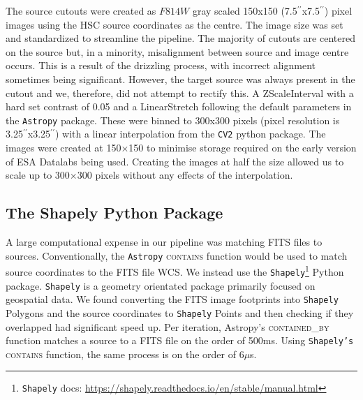 The source cutouts were created as $F814W$ gray scaled 150x150 (7.5$^{\prime \prime}$x7.5$^{\prime \prime}$) pixel images using the HSC source coordinates as the centre. The image size was set and standardized to streamline the pipeline. The majority of cutouts are centered on the source but, in a minority, misalignment between source and image centre occurs. This is a result of the drizzling process, with incorrect alignment sometimes being significant. However, the target source was always present in the cutout and we, therefore, did not attempt to rectify this. A ZScaleInterval with a hard set contrast of 0.05 and a LinearStretch following the default parameters in the \texttt{Astropy} \citep{astropy:2013, astropy:2018} package. These were binned to 300x300 pixels (pixel resolution is 3.25$^{\prime \prime}$x3.25$^{\prime \prime}$) with a linear interpolation from the \texttt{CV2} python package. The images were created at 150$\times$150 to minimise storage required on the early version of ESA Datalabs being used. Creating the images at half the size allowed us to scale up to 300$\times$300 pixels without any effects of the interpolation.

\subsection{The Shapely Python Package}\label{benchmarks}
\noindent A large computational expense in our pipeline was matching FITS files to sources. Conventionally, the \texttt{Astropy} \textsc{contains} function would be used to match source coordinates to the FITS file WCS. We instead use the \texttt{Shapely}\footnote{\texttt{Shapely} docs: \url{https://shapely.readthedocs.io/en/stable/manual.html}} Python package.  \texttt{Shapely} is a geometry orientated package primarily focused on geospatial data. We found converting the FITS image footprints into \texttt{Shapely} Polygons and the source coordinates to \texttt{Shapely} Points and then checking if they overlapped had significant speed up. Per iteration, Astropy's \textsc{contained\_by} function matches a source to a FITS file on the order of 500ms. Using \texttt{Shapely's} \textsc{contains} function, the same process is on the order of 6$\mu$s.



